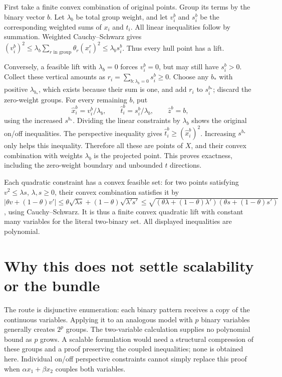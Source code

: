 \documentclass[11pt]{article}
\begin{document}
First take a finite convex combination of original points. Group its terms by
the binary vector $b$. Let $\lambda_b$ be total group weight, and let $v^b_i$
and $s^b_i$ be the corresponding weighted sums of $x_i$ and $t_i$.
All linear inequalities follow by summation. Weighted Cauchy--Schwarz gives
$(v^b_i)^2\le\lambda_b\sum_{r\text{ in group}}\theta_r(x_i^r)^2
\le\lambda_b s^b_i$. Thus every hull point has a lift.

Conversely, a feasible lift with $\lambda_b=0$ forces $v^b_i=0$, but may
still have $s^b_i>0$. Collect these vertical amounts as
$r_i=\sum_{b:\lambda_b=0}s^b_i\ge0$. Choose any $b_*$ with positive
$\lambda_{b_*}$, which exists because their sum is one, and add $r_i$
to $s^{b_*}_i$; discard the zero-weight groups. For every remaining $b$,
put
\[
\widehat x^b_i=v^b_i/\lambda_b,\qquad
\widehat t^b_i=s^b_i/\lambda_b,\qquad\widehat z^b=b,
\]
using the increased $s^{b_*}$. Dividing the linear constraints by $\lambda_b$
shows the original on/off inequalities. The perspective inequality gives
$\widehat t^b_i\ge(\widehat x^b_i)^2$. Increasing $s^{b_*}$ only helps this
inequality. Therefore all these are points of $X$, and their convex
combination with weights $\lambda_b$ is the projected point. This proves
exactness, including the zero-weight boundary and unbounded $t$ directions.

Each quadratic constraint has a convex feasible set: for two points satisfying
$v^2\le\lambda s$, $\lambda,s\ge0$, their convex combination satisfies it by
$|\theta v+(1-\theta)v'|
\le\theta\sqrt{\lambda s}+(1-\theta)\sqrt{\lambda's'}
\le\sqrt{(\theta\lambda+(1-\theta)\lambda')
(\theta s+(1-\theta)s')}$, using Cauchy--Schwarz.
It is thus a finite convex quadratic lift with constant many variables for
the literal two-binary set. All displayed inequalities are polynomial.

\section{Why this does not settle scalability or the bundle}
The route is disjunctive enumeration: each binary pattern receives a copy of
the continuous variables. Applying it to an analogous model with $p$ binary
variables generally creates $2^p$ groups. The two-variable calculation supplies
no polynomial bound as $p$ grows. A scalable formulation would need a structural
compression of these groups and a proof preserving the coupled inequalities;
none is obtained here. Individual on/off perspective constraints cannot simply
replace this proof when $\alpha x_1+\beta x_2$ couples both variables.
\end{document}

